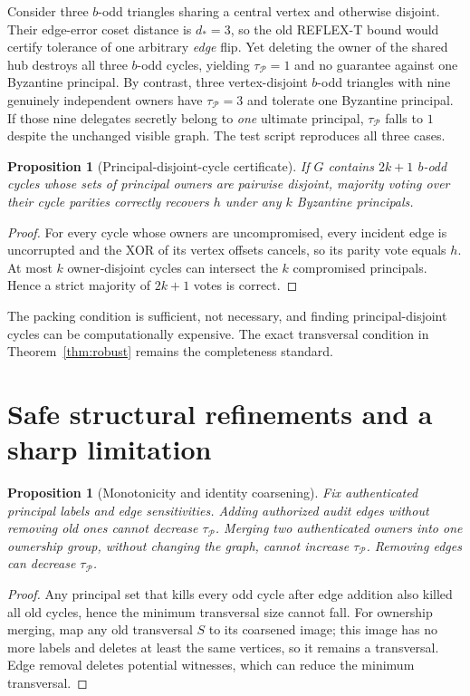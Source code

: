 \documentclass[10pt,a4paper]{article}
\newtheorem{proposition}[theorem]{Proposition}
\theoremstyle{definition}\newtheorem{definition}[theorem]{Definition}
\newcommand{\Princ}{\mathcal P}
\begin{document}
Consider three $b$-odd triangles sharing a central vertex and otherwise disjoint. Their edge-error coset distance is $d_*=3$, so the old REFLEX-T bound would certify tolerance of one arbitrary \emph{edge} flip. Yet deleting the owner of the shared hub destroys all three $b$-odd cycles, yielding $\tau_{\Princ}=1$ and no guarantee against one Byzantine principal. By contrast, three vertex-disjoint $b$-odd triangles with nine genuinely independent owners have $\tau_{\Princ}=3$ and tolerate one Byzantine principal. If those nine delegates secretly belong to \emph{one} ultimate principal, $\tau_{\Princ}$ falls to $1$ despite the unchanged visible graph. The test script reproduces all three cases.

\begin{proposition}[Principal-disjoint-cycle certificate]\label{prop:packing}
If $G$ contains $2k+1$ $b$-odd cycles whose sets of \emph{principal owners} are pairwise disjoint, majority voting over their cycle parities correctly recovers $h$ under any $k$ Byzantine principals.
\end{proposition}
\begin{proof}For every cycle whose owners are uncompromised, every incident edge is uncorrupted and the XOR of its vertex offsets cancels, so its parity vote equals $h$. At most $k$ owner-disjoint cycles can intersect the $k$ compromised principals. Hence a strict majority of $2k+1$ votes is correct.\end{proof}
The packing condition is sufficient, not necessary, and finding principal-disjoint cycles can be computationally expensive. The exact transversal condition in Theorem~\ref{thm:robust} remains the completeness standard.

\section{Safe structural refinements and a sharp limitation}
\begin{proposition}[Monotonicity and identity coarsening]\label{prop:mono}
Fix authenticated principal labels and edge sensitivities. Adding authorized audit edges without removing old ones cannot decrease $\tau_{\Princ}$. Merging two authenticated owners into one ownership group, without changing the graph, cannot increase $\tau_{\Princ}$. Removing edges can decrease $\tau_{\Princ}$.
\end{proposition}
\begin{proof}Any principal set that kills every odd cycle after edge addition also killed all old cycles, hence the minimum transversal size cannot fall. For ownership merging, map any old transversal $S$ to its coarsened image; this image has no more labels and deletes at least the same vertices, so it remains a transversal. Edge removal deletes potential witnesses, which can reduce the minimum transversal.\end{proof}
\end{document}
